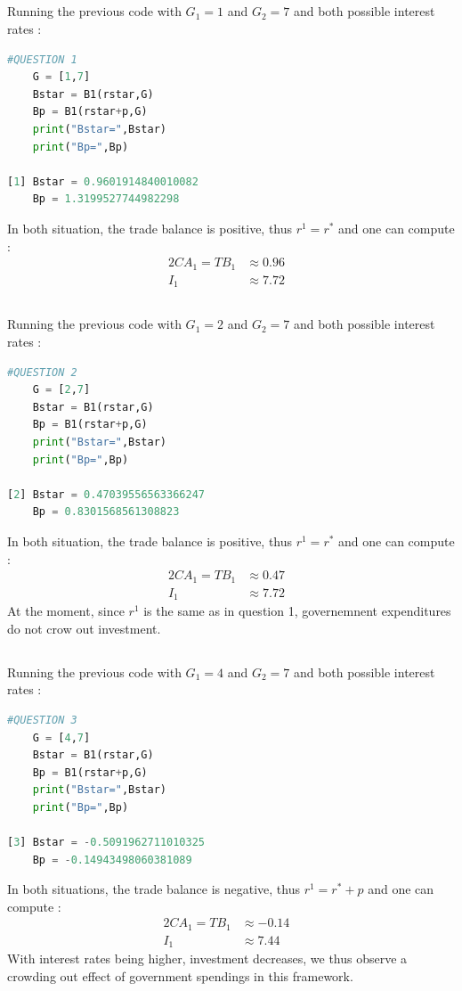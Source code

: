 \documentclass{article}
\begin{document}
\subsection{}
Running the previous code with $G_1 = 1$ and $G_2 = 7$ and both possible interest rates :
\begin{lstlisting}[language=Python, label=python_code]
    #QUESTION 1
    G = [1,7]
    Bstar = B1(rstar,G)
    Bp = B1(rstar+p,G)
    print("Bstar=",Bstar)
    print("Bp=",Bp)

[1] Bstar = 0.9601914840010082
    Bp = 1.3199527744982298
\end{lstlisting}
In both situation, the trade balance is positive, thus $r^1 = r^*$ and one can compute :
\begin{alignat}{2}
    CA_1  = TB_1 &\approx 0.96&\\
    I_1 &\approx 7.72
\end{alignat}
\subsection{}
Running the previous code with $G_1 = 2$ and $G_2 = 7$ and both possible interest rates :
\begin{lstlisting}[language=Python, label=python_code]
    #QUESTION 2
    G = [2,7]
    Bstar = B1(rstar,G)
    Bp = B1(rstar+p,G)
    print("Bstar=",Bstar)
    print("Bp=",Bp)

[2] Bstar = 0.47039556563366247
    Bp = 0.8301568561308823
\end{lstlisting}
In both situation, the trade balance is positive, thus $r^1 = r^*$ and one can compute :
\begin{alignat}{2}
    CA_1  = TB_1 &\approx 0.47&\\
    I_1 &\approx 7.72
\end{alignat}
At the moment, since $r^1$ is the same as in question 1, governemnent expenditures do not crow out investment.
\subsection{}
Running the previous code with $G_1 = 4$ and $G_2 = 7$ and both possible interest rates :
\begin{lstlisting}[language=Python, label=python_code]
    #QUESTION 3
    G = [4,7]
    Bstar = B1(rstar,G)
    Bp = B1(rstar+p,G)
    print("Bstar=",Bstar)
    print("Bp=",Bp)

[3] Bstar = -0.5091962711010325
    Bp = -0.14943498060381089
\end{lstlisting}
In both situations, the trade balance is negative, thus $r^1 = r^* + p$ and one can compute :
\begin{alignat}{2}
    CA_1  = TB_1 &\approx -0.14&\\
    I_1 &\approx 7.44
\end{alignat}
With interest rates being higher, investment decreases, we thus observe a crowding out effect of government spendings in this framework.
\end{document}
